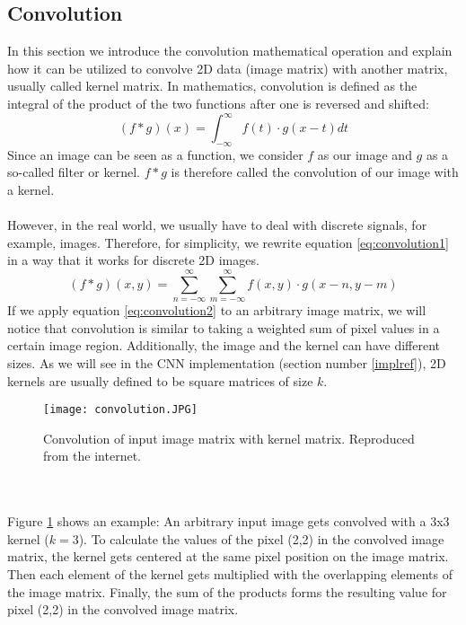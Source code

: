 \documentclass[a4paper, 11pt, twoside, openright]{article}
\begin{document}
\subsection{Convolution} \label{sub:convolution}
In this section we introduce the convolution mathematical operation and explain how it can be utilized to convolve 2D data (image matrix) with another matrix, usually called kernel matrix. In mathematics, convolution is defined as the integral of the product of the two functions after one is reversed and shifted:
\begin{equation}
(f * g)(x) = \int_{-\infty}^{\infty} f(t) \cdot g(x-t) dt
\label{eq:convolution1}
\end{equation}
Since an image can be seen as a function, we consider $f$ as our image and $g$ as a so-called filter or kernel. $f * g$ is therefore called the convolution of our image with a kernel. \\ \\
However, in the real world, we usually have to deal with discrete signals, for example, images.
Therefore, for simplicity, we rewrite equation \ref{eq:convolution1} in a way that it works for discrete 2D images.
\begin{equation}
(f * g)(x,y) = \sum_{n=-\infty}^{\infty} \sum_{m=-\infty}^{\infty} f(x,y) \cdot g(x-n,y-m)
\label{eq:convolution2}
\end{equation}
If we apply equation \ref{eq:convolution2} to an arbitrary image matrix, we will notice that convolution is similar to taking a weighted sum of pixel values in a certain image region. Additionally, the image and the kernel can have different sizes. As we will see in the CNN implementation (section number \ref{implref}), 2D kernels are usually defined to be square matrices of size $k$.
\begin{figure}[h!]
	\centering
  \texttt{[image: convolution.JPG]}
	\caption[]{Convolution of input image matrix with kernel matrix. Reproduced from the internet.\footnotemark}
	\label{convolution}
\end{figure} \\ \\
Figure \ref{convolution} shows an example: An arbitrary input image gets convolved with a 3x3 kernel ($k=3$). To calculate the values of the pixel (2,2) in the convolved image matrix, the kernel gets centered at the same pixel position on the image matrix. Then each element of the kernel gets multiplied with the overlapping elements of the image matrix. Finally, the sum of the products forms the resulting value for pixel (2,2) in the convolved image matrix.\\ \\
\end{document}
